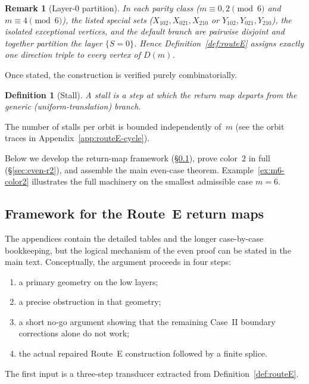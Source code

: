 \documentclass[11pt]{article}
\newtheorem{definition}{Definition}
\newtheorem{remark}{Remark}
\begin{document}
\begin{remark}[Layer-$0$ partition]\label{rem:layer0-partition}
In each parity class ($m\equiv 0,2\pmod 6$ and $m\equiv 4\pmod 6$), the listed special sets ($X_{102},X_{021},X_{210}$ or $Y_{102},Y_{021},Y_{210}$), the isolated exceptional vertices, and the default branch are pairwise disjoint and together partition the layer $\{S=0\}$.
Hence Definition~\ref{def:routeE} assigns exactly one direction triple to every vertex of $D(m)$.
\end{remark}

Once stated, the construction is verified purely combinatorially.

\begin{definition}[Stall]\label{def:stall}
A \emph{stall} is a step at which the return map departs from the generic (uniform-translation) branch.
\end{definition}

\noindent
The number of stalls per orbit is bounded independently of~$m$ (see the orbit traces in Appendix~\ref{app:routeE-cycle}).

Below we develop the return-map framework (\S\ref{sec:framework}), prove color~$2$ in full (\S\ref{sec:even-r2}), and assemble the main even-case theorem.
Example~\ref{ex:m6-color2} illustrates the full machinery on the smallest admissible case $m=6$.

\subsection{Framework for the Route~E return maps}\label{sec:framework}

The appendices contain the detailed tables and the longer case-by-case bookkeeping, but the logical mechanism of the even proof can be stated in the main text.
Conceptually, the argument proceeds in four steps:
\begin{enumerate}[label=\textup{(\roman*)},leftmargin=2.5em]
\item a primary geometry on the low layers;
\item a precise obstruction in that geometry;
\item a short no-go argument showing that the remaining Case~II boundary corrections alone do not work;
\item the actual repaired Route~E construction followed by a finite splice.
\end{enumerate}
The first input is a three-step transducer extracted from Definition~\ref{def:routeE}.
\end{document}
